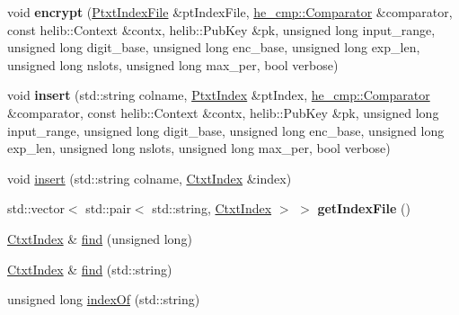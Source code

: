 \begin{DoxyCompactItemize}
\item 
\mbox{\label{classHDB__supergate___1_1CtxtIndexFile_a36979271995370a2e2376877cff9cf29}} 
void {\bfseries encrypt} (\hyperlink{classHDB__supergate___1_1PtxtIndexFile}{Ptxt\+Index\+File} \&pt\+Index\+File, \hyperlink{classhe__cmp_1_1Comparator}{he\+\_\+cmp\+::\+Comparator} \&comparator, const helib\+::\+Context \&contx, helib\+::\+Pub\+Key \&pk, unsigned long input\+\_\+range, unsigned long digit\+\_\+base, unsigned long enc\+\_\+base, unsigned long exp\+\_\+len, unsigned long nslots, unsigned long max\+\_\+per, bool verbose)
\item 
\mbox{\label{classHDB__supergate___1_1CtxtIndexFile_af5316d579090faa7872b4f00b5b55bdf}} 
void {\bfseries insert} (std\+::string colname, \hyperlink{classHDB__supergate___1_1PtxtIndex}{Ptxt\+Index} \&pt\+Index, \hyperlink{classhe__cmp_1_1Comparator}{he\+\_\+cmp\+::\+Comparator} \&comparator, const helib\+::\+Context \&contx, helib\+::\+Pub\+Key \&pk, unsigned long input\+\_\+range, unsigned long digit\+\_\+base, unsigned long enc\+\_\+base, unsigned long exp\+\_\+len, unsigned long nslots, unsigned long max\+\_\+per, bool verbose)
\item 
void \hyperlink{classHDB__supergate___1_1CtxtIndexFile_ab581d8e3c893b29a80b18413b1c45412}{insert} (std\+::string colname, \hyperlink{classHDB__supergate___1_1CtxtIndex}{Ctxt\+Index} \&index)
\item 
\mbox{\label{classHDB__supergate___1_1CtxtIndexFile_a8bb51b5beedb6d43770a6d248b61e2d3}} 
std\+::vector$<$ std\+::pair$<$ std\+::string, \hyperlink{classHDB__supergate___1_1CtxtIndex}{Ctxt\+Index} $>$ $>$ {\bfseries get\+Index\+File} ()
\item 
\hyperlink{classHDB__supergate___1_1CtxtIndex}{Ctxt\+Index} \& \hyperlink{classHDB__supergate___1_1CtxtIndexFile_a52792f06177d60f6580a664f24b706ee}{find} (unsigned long)
\item 
\hyperlink{classHDB__supergate___1_1CtxtIndex}{Ctxt\+Index} \& \hyperlink{classHDB__supergate___1_1CtxtIndexFile_aa579ec2799b316a65f426356ca76efd8}{find} (std\+::string)
\item 
unsigned long \hyperlink{classHDB__supergate___1_1CtxtIndexFile_abbc89b8e64ca3bcfe104c2371336bd9f}{index\+Of} (std\+::string)

\end{DoxyCompactItemize}
